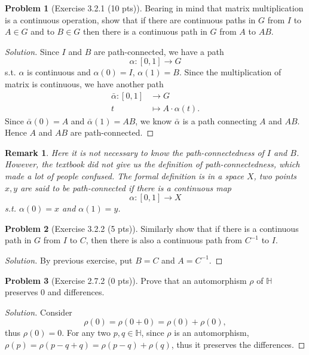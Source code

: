 \documentclass{article}
\theoremstyle{definition}
\newtheorem{problem}{Problem}
\theoremstyle{plain}
\newtheorem*{remark}{Remark}
\begin{document}
\begin{problem}[Exercise 3.2.1 (10 pts)]Bearing in mind that matrix multiplication is a continuous operation, show that if there are continuous paths in $G$ from $I$ to $A\in G$ and to $B\in G$ then there is a continuous path in $G$ from $A$ to $AB$.
\end{problem}
\begin{adjustwidth}{0.7cm}{}
\color{blue}
\begin{proof}[Solution]Since $I$ and $B$ are path-connected, we have a path
\begin{displaymath}
\alpha:[0,1]\to G
\end{displaymath}
s.t. $\alpha$ is continuous and $\alpha(0)=I$, $\alpha(1)=B$. Since the multiplication of matrix is continuous, we have another path
\begin{align*}
\bar{\alpha}:[0,1]&\to G\\
t&\mapsto A\cdot\alpha(t).
\end{align*}
Since $\bar\alpha(0)=A$ and $\bar\alpha(1)=AB$, we know $\bar{\alpha}$ is a path connecting $A$ and $AB$. Hence $A$ and $AB$ are path-connected.
\color{black}
\end{proof}
\end{adjustwidth}
\begin{remark}
Here it is not necessary to know the path-connectedness of $I$ and $B$. However, the textbook did not give us the definition of path-connectedness, which made a lot of people confused. The formal definition is in a space $X$, two points $x,y$ are said to be path-connected if there is a continuous map
\begin{displaymath}
\alpha:[0,1]\to X
\end{displaymath}
s.t. $\alpha(0)=x$ and $\alpha(1)=y$.
\end{remark}

\begin{problem}[Exercise 3.2.2 (5 pts)]Similarly show that if  there is a continuous path in $G$ from $I$ to $C$, then there is also a continuous path from $C^{-1}$ to $I$.
\end{problem}
\begin{adjustwidth}{0.7cm}{}
\color{blue}
\begin{proof}[Solution]By previous exercise, put $B=C$ and $A=C^{-1}$.
\color{black}
\end{proof}
\end{adjustwidth}

\begin{problem}[Exercise 2.7.2 (0 pts)]Prove that an automorphism $\rho$ of $\mathbb{H}$ preserves 0 and differences.
\end{problem}
\begin{adjustwidth}{0.7cm}{}
\color{blue}
\begin{proof}[Solution]Consider
\begin{displaymath}
\rho(0)=\rho(0+0)=\rho(0)+\rho(0),
\end{displaymath}
thus $\rho(0)=0$. For any two $p,q\in\mathbb{H}$, since $\rho$ is an automorphism, $\rho(p)=\rho(p-q+q)=\rho(p-q)+\rho(q)$, thus it preserves the differences.
\color{black}
\end{proof}
\end{adjustwidth}
\end{document}
